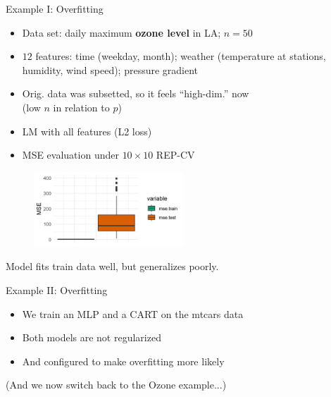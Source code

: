 \documentclass[11pt,compress,t,notes=noshow, xcolor=table]{beamer}
\begin{document}
\begin{vbframe}{Example I: Overfitting}

\begin{itemize}
\item Data set: daily maximum \textbf{ozone level} in LA; $n = 50$
\item $12$ features: time (weekday, month); weather (temperature at stations, humidity, wind speed); pressure gradient
\item Orig. data was subsetted, so it feels \enquote{high-dim.} now \\
(low $n$ in relation to $p$)

\item LM with all features (L2 loss)


\item MSE evaluation under $10 \times 10$ REP-CV

\end{itemize}

\begin{figure}
\includegraphics[width=0.5\textwidth]{figure/ozone_mse_boxplot.png}\\
\end{figure}

Model fits train data well, but generalizes poorly.

\end{vbframe}

\begin{vbframe}{Example II: Overfitting}

\begin{itemize}
 \item We train an MLP and a CART on the mtcars data
\item Both models are not regularized
\item And configured to make overfitting more likely
\end{itemize}

\lz \lz



\lz \lz

(And we now switch back to the Ozone example...)

\end{vbframe}
\end{document}
